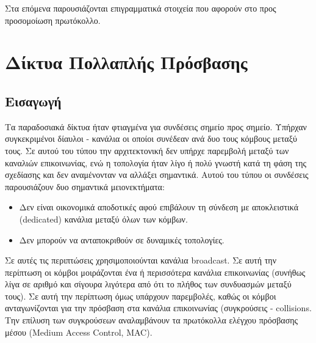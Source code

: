 \documentclass[12pt]{report}
\begin{document}
Στα επόμενα παρουσιάζονται επιγραμματικά στοιχεία που αφορούν στο προς προσομοίωση πρωτόκολλο.

\section{Δίκτυα Πολλαπλής Πρόσβασης}
\subsection{Εισαγωγή}
Τα παραδοσιακά δίκτυα ήταν φτιαγμένα για συνδέσεις σημείο προς σημείο. Υπήρχαν συγκεκριμένοι δίαυλοι - κανάλια οι οποίοι συνέδεαν ανά δυο τους κόμβους μεταξύ τους. Σε αυτού του τύπου την αρχιτεκτονική δεν υπήρχε παρεμβολή μεταξύ των καναλιών επικοινωνίας, ενώ η τοπολογία ήταν λίγο ή πολύ γνωστή κατά τη φάση της σχεδίασης και δεν αναμένονταν να αλλάξει σημαντικά. Αυτού του τύπου οι συνδέσεις παρουσιάζουν δυο σημαντικά μειονεκτήματα:

\begin{itemize}
  \item Δεν είναι οικονομικά αποδοτικές αφού επιβάλουν τη σύνδεση με αποκλειστικά (\textlatin{dedicated}) κανάλια μεταξύ όλων των κόμβων.
  \item Δεν μπορούν να ανταποκριθούν σε δυναμικές τοπολογίες.
\end{itemize}

Σε αυτές τις περιπτώσεις χρησιμοποιούνται κανάλια \textlatin{broadcast}. Σε αυτή την περίπτωση οι κόμβοι μοιράζονται ένα ή περισσότερα κανάλια επικοινωνίας (συνήθως λίγα σε αριθμό και σίγουρα λιγότερα από ότι το πλήθος των συνδυασμών μεταξύ τους). Σε αυτή την περίπτωση όμως υπάρχουν παρεμβολές, καθώς οι κόμβοι ανταγωνίζονται για την πρόσβαση στα κανάλια επικοινωνίας (συγκρούσεις - \textlatin{collisions}. Την επίλυση των συγκρούσεων αναλαμβάνουν τα πρωτόκολλα ελέγχου πρόσβασης μέσου (\textlatin{Medium Access Control, MAC}).
\end{document}
